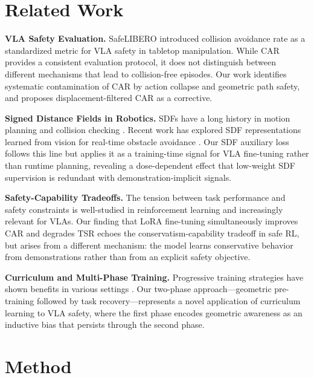 \documentclass[letterpaper]{article}
\begin{document}
\section{Related Work}

\textbf{VLA Safety Evaluation.} SafeLIBERO \citep{safelibero2025} introduced collision avoidance rate as a standardized metric for VLA safety in tabletop manipulation. While CAR provides a consistent evaluation protocol, it does not distinguish between different mechanisms that lead to collision-free episodes. Our work identifies systematic contamination of CAR by action collapse and geometric path safety, and proposes displacement-filtered CAR as a corrective.

\textbf{Signed Distance Fields in Robotics.} SDFs have a long history in motion planning and collision checking \citep{ratliff2009chomp, zucker2013chomp}. Recent work has explored SDF representations learned from vision for real-time obstacle avoidance \citep{driess2022learning}. Our SDF auxiliary loss follows this line but applies it as a training-time signal for VLA fine-tuning rather than runtime planning, revealing a dose-dependent effect that low-weight SDF supervision is redundant with demonstration-implicit signals.

\textbf{Safety-Capability Tradeoffs.} The tension between task performance and safety constraints is well-studied in reinforcement learning \citep{achiam2017constrained} and increasingly relevant for VLAs. Our finding that LoRA fine-tuning simultaneously improves CAR and degrades TSR echoes the conservatism-capability tradeoff in safe RL, but arises from a different mechanism: the model learns conservative behavior from demonstrations rather than from an explicit safety objective.

\textbf{Curriculum and Multi-Phase Training.} Progressive training strategies have shown benefits in various settings \citep{bengio2009curriculum}. Our two-phase approach---geometric pre-training followed by task recovery---represents a novel application of curriculum learning to VLA safety, where the first phase encodes geometric awareness as an inductive bias that persists through the second phase.


\section{Method}
\end{document}
